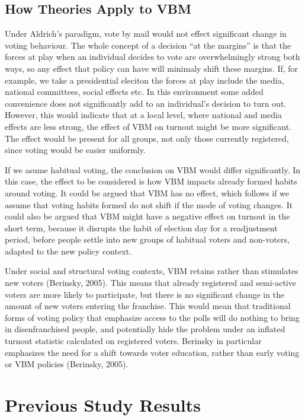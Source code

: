 \documentclass[12pt,twoside]{reedthesis}
\begin{document}
  \subsection{How Theories Apply to VBM}\label{how-theories-apply-to-vbm}
  
  Under Aldrich's paradigm, vote by mail would not effect significant
  change in voting behaviour. The whole concept of a decision ``at the
  margins'' is that the forces at play when an individual decides to vote
  are overwhelmingly strong both ways, so any effect that policy can have
  will minimaly shift these margins. If, for example, we take a
  presidential eleciton the forces at play include the media, national
  committees, social effects etc. In this environment some added
  convenience does not significantly add to an individual's decision to
  turn out. However, this would indicate that at a local level, where
  national and media effects are less strong, the effect of VBM on turnout
  might be more significant. The effect would be present for all groups,
  not only those currently registered, since voting would be easier
  uniformly.
  
  If we asume habitual voting, the conclusion on VBM would differ
  significantly. In this case, the effect to be considered is how VBM
  impacts already formed habits around voting. It could be argued that VBM
  has no effect, which follows if we assume that voting habits formed do
  not shift if the mode of voting changes. It could also be argued that
  VBM might have a negative effect on turnout in the short term, because
  it disrupts the habit of election day for a readjustment period, before
  people settle into new groups of habitual voters and non-voters, adapted
  to the new policy context.
  
  Under social and structural voting contexts, VBM retains rather than
  stimulates new voters (Berinsky, 2005). This means that already
  registered and semi-active voters are more likely to participate, but
  there is no significant change in the amount of new voters entering the
  franchise. This would mean that traditional forms of voting policy that
  emphasize access to the polls will do nothing to bring in
  disenfranchised people, and potentially hide the problem under an
  inflated turnout statistic calculated on registered voters. Berinsky in
  particular emphasizes the need for a shift towards voter education,
  rather than early voting or VBM policies (Berinsky, 2005).
  
  \section{Previous Study Results}\label{previous-study-results}
  
\end{document}
